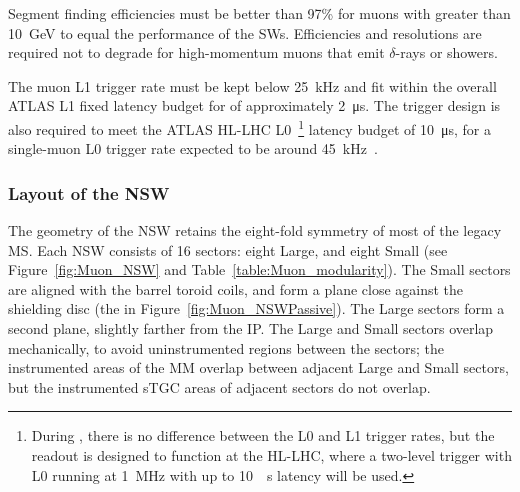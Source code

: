 \documentclass[cernpreprint, atlasdraft=false, UKenglish,british,orcidlogo, texmf, orcidlogo]{atlasdoc}
\begin{document}
Segment finding efficiencies must be better than 97\% for muons with \pT greater than \SI{10}{\GeV} to equal the performance of the \glspl{SW}.
Efficiencies and resolutions are required not to degrade for high-momentum muons that emit $\delta$-rays or showers.
 
The muon \gls{L1} trigger rate must be kept below \SI{25}{\kHz} and fit within the overall ATLAS \gls{L1} fixed latency budget for \RunThr of approximately \SI{2}{\us}.
The trigger design is also required to meet the ATLAS \gls{HL-LHC} \gls{L0}~\footnote{During \RunThr, there is no difference between the \gls{L0} and \gls{L1} trigger rates, but the readout is designed to function at the \gls{HL-LHC}, where a two-level trigger with \gls{L0} running at \SI{1}{\MHz} with up to \SI{10}{\SIUnitSymbolMicro\s} latency will be used.}
latency budget of \SI{10}{\us}, for a single-muon \gls{L0} trigger rate expected to be around \SI{45}{\kHz}~\cite{ATLAS-TDR-29}.
 
 
\subsubsection{Layout of the NSW \label{muonSS:layout}}
The geometry of the \gls{NSW} retains the eight-fold symmetry of most of the legacy \gls{MS}. Each \gls{NSW} consists of 16 sectors: eight Large, and eight Small (see Figure~\ref{fig:Muon_NSW} and Table~\ref{table:Muon_modularity}). The Small sectors are aligned with the barrel toroid coils, and form a plane close against the shielding disc (the  in Figure~\ref{fig:Muon_NSWPassive}). The Large sectors form a second plane, slightly farther from the \gls{IP}. The Large and Small sectors overlap mechanically, to avoid uninstrumented regions between the sectors; the instrumented areas of the \gls{MM} overlap between adjacent Large and Small sectors, but the instrumented \gls{sTGC} areas of adjacent sectors do not overlap.
 
\end{document}
